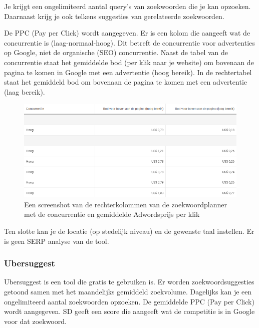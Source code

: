 Je krijgt een ongelimiteerd aantal query's van zoekwoorden die je kan opzoeken. Daarnaast krijg je ook telkens suggesties van gerelateerde zoekwoorden. 

De PPC (Pay per Click) wordt aangegeven. Er is een kolom die aangeeft wat de concurrentie is (laag-normaal-hoog). Dit betreft de concurrentie voor advertenties op Google, niet de organische (SEO) concurrentie. Naast de tabel van de concurrentie staat het gemiddelde bod (per klik naar je website) om bovenaan de pagina te komen in Google met een advertentie (hoog bereik). In de rechtertabel staat het gemiddeld bod om bovenaan de pagina te komen met een advertentie (laag bereik). 

\begin{figure}[h!]
\centering
\includegraphics[width=\linewidth]{img/Zoekwoordplannercon.PNG}
\caption{Een screenshot van de rechterkolommen van de zoekwoordplanner met de concurrentie en gemiddelde Adwordsprijs per klik \autocite{google.be}}
\end{figure}

Ten slotte kan je de locatie (op stedelijk niveau) en de gewenste taal instellen. Er is geen SERP analyse van de tool.

\subsubsection{Ubersuggest}
\label{ch: Ubersuggest}

Ubersuggest is een tool die gratis te gebruiken is. Er worden zoekwoordsuggesties getoond samen met het maandelijks gemiddeld zoekvolume. Dagelijks kan je een ongelimiteerd aantal zoekwoorden opzoeken. De gemiddelde PPC (Pay per Click) wordt aangegeven. SD geeft een score die aangeeft wat de competitie is in Google voor dat zoekwoord. 

